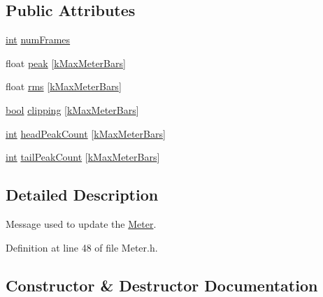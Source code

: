 \subsection*{Public Attributes}
\begin{DoxyCompactItemize}
\item 
\hyperlink{xmltok_8h_a5a0d4a5641ce434f1d23533f2b2e6653}{int} \hyperlink{class_meter_update_msg_a075414b7b82c0c40fecce46c2dddc217}{num\+Frames}
\item 
float \hyperlink{class_meter_update_msg_a375b091b583aa3f7cee515d8033c8f2e}{peak} \mbox{[}\hyperlink{_meter_8h_a378e3b97f3b428008f261c1106c8852e}{k\+Max\+Meter\+Bars}\mbox{]}
\item 
float \hyperlink{class_meter_update_msg_aafa73fca5107d8c49302cd0227edc8a5}{rms} \mbox{[}\hyperlink{_meter_8h_a378e3b97f3b428008f261c1106c8852e}{k\+Max\+Meter\+Bars}\mbox{]}
\item 
\hyperlink{mac_2config_2i386_2lib-src_2libsoxr_2soxr-config_8h_abb452686968e48b67397da5f97445f5b}{bool} \hyperlink{class_meter_update_msg_a0ddff66f9567976e0c80174e5a5957eb}{clipping} \mbox{[}\hyperlink{_meter_8h_a378e3b97f3b428008f261c1106c8852e}{k\+Max\+Meter\+Bars}\mbox{]}
\item 
\hyperlink{xmltok_8h_a5a0d4a5641ce434f1d23533f2b2e6653}{int} \hyperlink{class_meter_update_msg_a40b555082e30dc672fe64122f7e250af}{head\+Peak\+Count} \mbox{[}\hyperlink{_meter_8h_a378e3b97f3b428008f261c1106c8852e}{k\+Max\+Meter\+Bars}\mbox{]}
\item 
\hyperlink{xmltok_8h_a5a0d4a5641ce434f1d23533f2b2e6653}{int} \hyperlink{class_meter_update_msg_a3c6bf541dc0bf9a9580eeb279ad0c9c9}{tail\+Peak\+Count} \mbox{[}\hyperlink{_meter_8h_a378e3b97f3b428008f261c1106c8852e}{k\+Max\+Meter\+Bars}\mbox{]}
\end{DoxyCompactItemize}


\subsection{Detailed Description}
Message used to update the \hyperlink{class_meter}{Meter}. 

Definition at line 48 of file Meter.\+h.



\subsection{Constructor \& Destructor Documentation}
